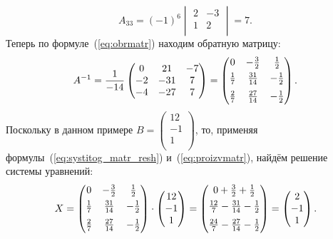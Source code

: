 \documentclass[10pt]{article}
\numberwithin{primer}{section}
\numberwithin{equation}{section}
\begin{document}
\begin{equation*}
A_{33}=(-1)^6\begin{vmatrix}
2 & -3 \\
1 & 2 \\
\end{vmatrix}=7.
\end{equation*}
Теперь по формуле~(\ref{eq:obrmatr}) находим обратную матрицу:
\begin{equation*}
A^{-1}=\frac{1}{-14}\begin{pmatrix}
0 & 21 & -7 \\
-2 & -31 & 7 \\
-4 & -27 & 7\\
\end{pmatrix}=\begin{pmatrix}
0 & -\tfrac{3}{2} & \tfrac{1}{2} \\
\tfrac{1}{7}\vphantom{\sqrt{\tfrac{1}{6}}} & \tfrac{31}{14} & -\tfrac{1}{2} \\
\tfrac{2}{7}\vphantom{\sqrt{\tfrac{1}{6}}} & \tfrac{27}{14} & -\tfrac{1}{2}\\
\end{pmatrix}.
\end{equation*}
Поскольку в данном примере
$B=\begin{pmatrix}
12 \\
-1 \\
1 \\
\end{pmatrix}$, то, применяя формулы~(\ref{eq:systitog_matr_resh}) и~(\ref{eq:proizvmatr}), найдём решение системы уравнений:
\begin{equation*}
X=\begin{pmatrix}
0 & -\tfrac{3}{2} & \tfrac{1}{2} \\
\tfrac{1}{7}\vphantom{\sqrt{\tfrac{1}{6}}} & \tfrac{31}{14} & -\tfrac{1}{2} \\
\tfrac{2}{7}\vphantom{\sqrt{\tfrac{1}{6}}} & \tfrac{27}{14} & -\tfrac{1}{2}\\
\end{pmatrix}\cdot\begin{pmatrix}
12 \\
-1 \\
1 \\
\end{pmatrix}=\begin{pmatrix}
0 + \tfrac{3}{2} + \tfrac{1}{2}  \\
\tfrac{12}{7}\vphantom{\sqrt{\tfrac{1}{6}}}-\tfrac{31}{14}-\tfrac{1}{2} \\
\tfrac{24}{7}\vphantom{\sqrt{\tfrac{1}{6}}}-\tfrac{27}{14}-\tfrac{1}{2} \\
\end{pmatrix}=\begin{pmatrix}
2\\
-1 \\
1\\
\end{pmatrix}.
\end{equation*}
\end{document}
